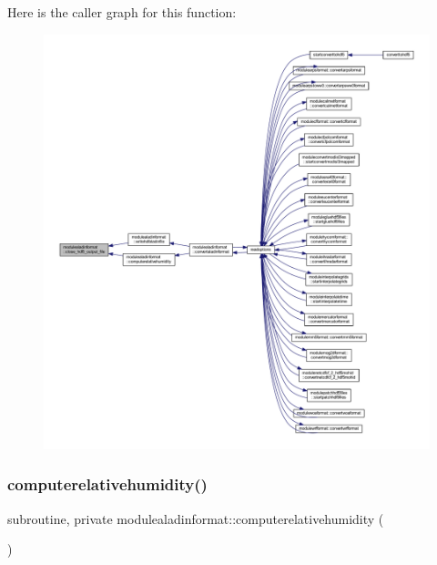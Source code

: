 Here is the caller graph for this function\+:\nopagebreak
\begin{figure}[H]
\begin{center}
\leavevmode
\includegraphics[width=350pt]{namespacemodulealadinformat_af21c9df5cd692b1f56a959cc52cba7d8_icgraph}
\end{center}
\end{figure}
\mbox{\label{namespacemodulealadinformat_ae9288daa19c82d5cb2b9c128f3b55cbc}} 
\subsubsection{\texorpdfstring{computerelativehumidity()}{computerelativehumidity()}}
{\footnotesize\ttfamily subroutine, private modulealadinformat\+::computerelativehumidity (\begin{DoxyParamCaption}{ }\end{DoxyParamCaption})\hspace{0.3cm}{\ttfamily [private]}}


